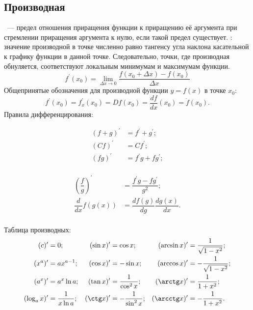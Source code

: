 \subsection{Производная}
~--- предел отношения приращения функции к приращению её аргумента при стремлении приращения аргумента к нулю, если такой предел существует. : значение производной в точке численно равно тангенсу угла наклона касательной к графику функции в данной точке. Следовательно, точки, где производная обнуляется, соответствуют локальным минимумам и максимумам функции.
\begin{equation}
f^\prime(x_0) = \lim_{\Delta x \to 0}\frac{f(x_0 + \Delta x) - f(x_0)}{\Delta x}
\end{equation}
Общепринятые обозначения для производной функции $y = f(x)$ в точке $x_0$:
\begin{equation}
f^\prime(x_0) = f^\prime_x(x_0) = D f(x_0) = \frac{d f}{d x}(x_0) = \dot{f} (x_0).
\end{equation}
Правила дифференцирования:\\
\begin{minipage}{0.5\textwidth}
\begin{align*}
(f+g)^\prime &= f^\prime + g^\prime;\\
(Cf)^\prime &= Cf^\prime;\\
(fg)^\prime &= f^\prime g + f g^\prime;\\
\end{align*}
\end{minipage}
\begin{minipage}{0.5\textwidth}
\begin{align*}
\left(\dfrac{f}{g}\right)^\prime &= \dfrac{f^\prime g - f g^\prime}{g^2};\\
\dfrac{d}{dx}f(g(x)) &= \dfrac{df(g)}{dg}\dfrac{dg(x)}{dx}.\\
\end{align*}
\end{minipage}
Таблица производных:
\begin{align*}
(c)^\prime &= 0; 
& (\sin x)^\prime &= \cos x; 
& (\arcsin x)^\prime &= 
\dfrac{1}{\sqrt{1 - x^2}}; \\
(x^a)^\prime &= a x^{a-1}; 
& (\cos x)^\prime &= - \sin x; 
& (\arccos x)^\prime &= - \dfrac{1}{\sqrt{1 - x^2}}; \\
(a^x)^\prime &= a^x \ln a; & (\tan x)^\prime &= \dfrac{1}{\cos^2 x}; 
& (\arctg x)^\prime &= \dfrac{1}{1 + x^2}; \\
(\log_a x)^\prime &= \dfrac{1}{x \ln a}; 
& (\ctg x)^\prime &= - \dfrac{1}{\sin^2 x}; 
& (\arcctg x)^\prime &= - \dfrac{1}{1 + x^2}.
\end{align*}

